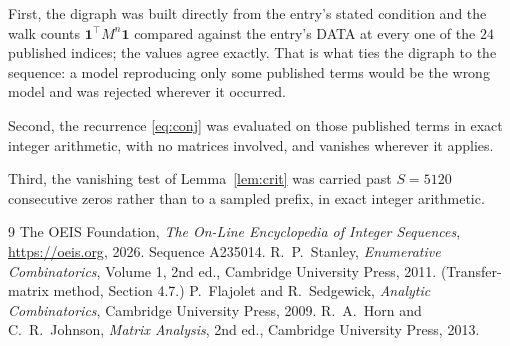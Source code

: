 \documentclass[11pt,a4paper]{article}
\theoremstyle{plain}
\theoremstyle{definition}
\begin{document}
First, the digraph was built directly from the entry's stated condition and the walk counts
$\mathbf{1}^{\!\top}M^{n}\mathbf{1}$ compared against the entry's DATA at every one of
the $24$ published indices; the values agree exactly. That is what ties the digraph to
the sequence: a model reproducing only some published terms would be the wrong model and
was rejected wherever it occurred.

Second, the recurrence \eqref{eq:conj} was evaluated on those published terms in exact
integer arithmetic, with no matrices involved, and vanishes wherever it applies.

Third, the vanishing test of Lemma~\ref{lem:crit} was carried past $S=5120$ consecutive
zeros rather than to a sampled prefix, in exact integer arithmetic.

\begin{thebibliography}{9}
 The OEIS Foundation, \emph{The On-Line Encyclopedia of Integer
Sequences}, \url{https://oeis.org}, 2026. Sequence A235014.
 R.~P.~Stanley, \emph{Enumerative Combinatorics}, Volume 1, 2nd ed.,
Cambridge University Press, 2011. (Transfer-matrix method, Section 4.7.)
 P.~Flajolet and R.~Sedgewick, \emph{Analytic Combinatorics}, Cambridge
University Press, 2009.
 R.~A.~Horn and C.~R.~Johnson, \emph{Matrix Analysis}, 2nd ed., Cambridge
University Press, 2013.
\end{thebibliography}
\end{document}
